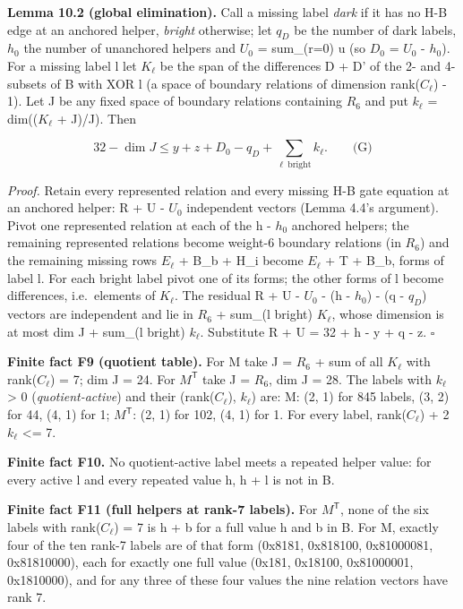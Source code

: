 \textbf{Lemma 10.2 (global elimination).} Call a missing label \emph{dark} if it has no H-B edge at an anchored helper, \emph{bright} otherwise; let \(q_D\) be the number of dark labels, \(h_0\) the number of unanchored helpers and \(U_0\) = sum\_(r=0) u (so \(D_0\) = \(U_0\) - \(h_0\)). For a missing label l let \(K_\ell\) be the span of the differences D + D' of the 2- and 4-subsets of B with XOR l (a space of boundary relations of dimension rank(\(C_\ell\)) - 1). Let J be any fixed space of boundary relations containing \(R_6\) and put \(k_\ell\) = dim((\(K_\ell\) + J)/J). Then

\[
32-\dim J\le y+z+D_0-q_D+\sum_{\ell\ \mathrm{bright}}k_\ell.\qquad\text{(G)}
\]

\emph{Proof.} Retain every represented relation and every missing H-B gate equation at an anchored helper: R + U - \(U_0\) independent vectors (Lemma 4.4's argument). Pivot one represented relation at each of the h - \(h_0\) anchored helpers; the remaining represented relations become weight-6 boundary relations (in \(R_6\)) and the remaining missing rows \(E_\ell\) + B\_b + H\_i become \(E_\ell\) + T + B\_b, forms of label l. For each bright label pivot one of its forms; the other forms of l become differences, i.e.~elements of \(K_\ell\). The residual R + U - \(U_0\) - (h - \(h_0\)) - (q - \(q_D\)) vectors are independent and lie in \(R_6\) + sum\_(l bright) \(K_\ell\), whose dimension is at most dim J + sum\_(l bright) \(k_\ell\). Substitute R + U = 32 + h - y + q - z. \(\square\)

\textbf{Finite fact F9 (quotient table).} For M take J = \(R_6\) + sum of all \(K_\ell\) with rank(\(C_\ell\)) = 7; dim J = 24. For \(M^{\mathsf T}\) take J = \(R_6\), dim J = 28. The labels with \(k_\ell\) \textgreater{} 0 (\emph{quotient-active}) and their (rank(\(C_\ell\)), \(k_\ell\)) are: M: (2, 1) for 845 labels, (3, 2) for 44, (4, 1) for 1; \(M^{\mathsf T}\): (2, 1) for 102, (4, 1) for 1. For every label, rank(\(C_\ell\)) + 2 \(k_\ell\) \textless= 7.

\textbf{Finite fact F10.} No quotient-active label meets a repeated helper value: for every active l and every repeated value h, h + l is not in B.

\textbf{Finite fact F11 (full helpers at rank-7 labels).} For \(M^{\mathsf T}\), none of the six labels with rank(\(C_\ell\)) = 7 is h + b for a full value h and b in B. For M, exactly four of the ten rank-7 labels are of that form (0x8181, 0x818100, 0x81000081, 0x81810000), each for exactly one full value (0x181, 0x18100, 0x81000001, 0x1810000), and for any three of these four values the nine relation vectors have rank 7.

